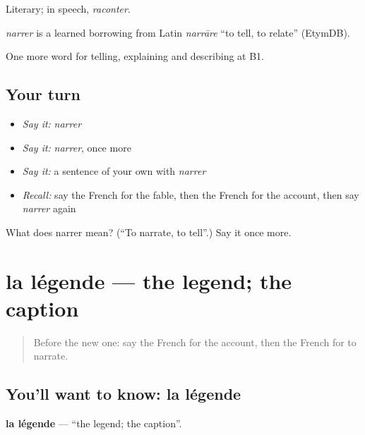 Literary; in speech, \emph{raconter}.

\begin{cousinweb}
\emph{narrer} is a learned borrowing from Latin \emph{narrāre} \textquotedblleft{}to tell, to relate\textquotedblright{} (EtymDB).
\end{cousinweb}

\begin{grammarlens}[title={What you've built}]
One more word for telling, explaining and describing at B1.
\end{grammarlens}

\subsection*{Your turn}
\begin{itemize}
\raggedright
  \item \emph{Say it:} \emph{narrer}
  \item \emph{Say it:} \emph{narrer}, once more
  \item \emph{Say it:} a sentence of your own with \emph{narrer}
  \item \emph{Recall:} say the French for the fable, then the French for the account, then say \emph{narrer} again
\end{itemize}

\begin{tcolorbox}[breakable,colback=teal!4,colframe=teal!35!black,title={Before you move on}]
What does narrer mean? (\textquotedblleft{}To narrate, to tell\textquotedblright{}.) Say it once more.
\end{tcolorbox}
\section[la légende]{la légende — the legend; the caption}

\label{lesson:FR-C322-legende}



\begin{quote}
Before the new one: say the French for the account, then the French for to narrate.
\end{quote}

\subsection*{You'll want to know: la légende}
\textbf{la légende} — \textquotedblleft{}the legend; the caption\textquotedblright{}.

